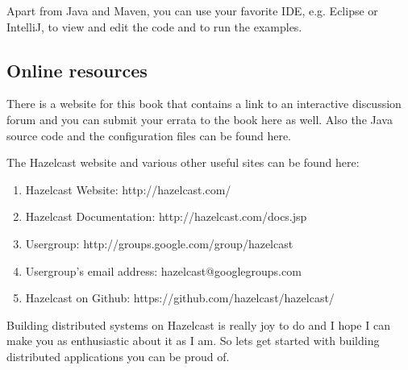 Apart from Java and Maven, you can use your favorite IDE, e.g. Eclipse or IntelliJ, to view and edit the code and to run the examples. 

\subsection*{Online resources}
There is a website for this book that contains a link to an interactive discussion forum and you can submit your errata to the book here as well. Also the Java source code and the configuration files can be found here. 

The Hazelcast website and various other useful sites can be found here:
\begin{enumerate}
\item Hazelcast Website: http://hazelcast.com/
\item Hazelcast Documentation: http://hazelcast.com/docs.jsp
\item Usergroup: http://groups.google.com/group/hazelcast
\item Usergroup's email address: hazelcast@googlegroups.com
\item Hazelcast on Github: https://github.com/hazelcast/hazelcast/
\end{enumerate}
Building distributed systems on Hazelcast is really joy to do and I hope I can make you as enthusiastic about it as I am. So lets get started with building distributed applications you can be proud of.
